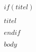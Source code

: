 \documentclass{\VorlagenPfad/coderdojokatext}
\begin{document}
$if(titel)$
\begin{center}
	{\huge $titel$}
\end{center}
$endif$

$body$
\end{document}
